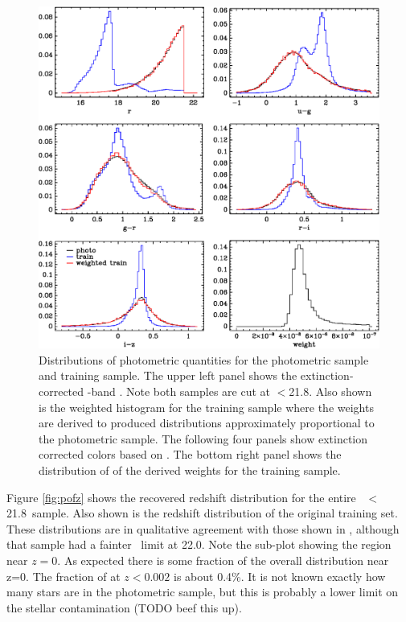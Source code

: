 \documentclass[preprint]{aastex}
\newcommand{\rmax}{21.8}
\begin{document}
\begin{figure}[t] \centering
    \includegraphics{figures/zweight-09-varhist.eps}

    \caption{Distributions of photometric quantities for the photometric sample
    and training sample.  The upper left panel shows the extinction-corrected
    \rmag-band \cmodelmag.  Note both samples are cut at \rmag$ < $\rmax.  
    Also shown is the weighted histogram for the training sample where
    the weights are derived to produced distributions approximately 
    proportional to the photometric sample.
    The following four panels show extinction corrected colors based on
    \modelmag.  The bottom right panel shows the distribution of of the
    derived weights for the training sample.}
    \label{fig:varhist}

    \vspace{2em}
\end{figure}

Figure \ref{fig:pofz} shows the recovered redshift distribution for the entire
\rmag\ $<$ \rmax\ sample.  Also shown is the redshift distribution of the
original training set.  These distributions are in qualitative agreement with
those shown in \citet{CunhaPhotoz09}, although that sample had a fainter \rmag\
limit at 22.0.  Note the sub-plot showing the region near $z=0$.  As expected
there is some fraction of the overall distribution near z=0.  The fraction of
at $z < 0.002$ is about 0.4\%.  It is not known exactly how many stars are in
the photometric sample, but this is probably a lower limit on the stellar
contamination (TODO beef this up).
\end{document}
